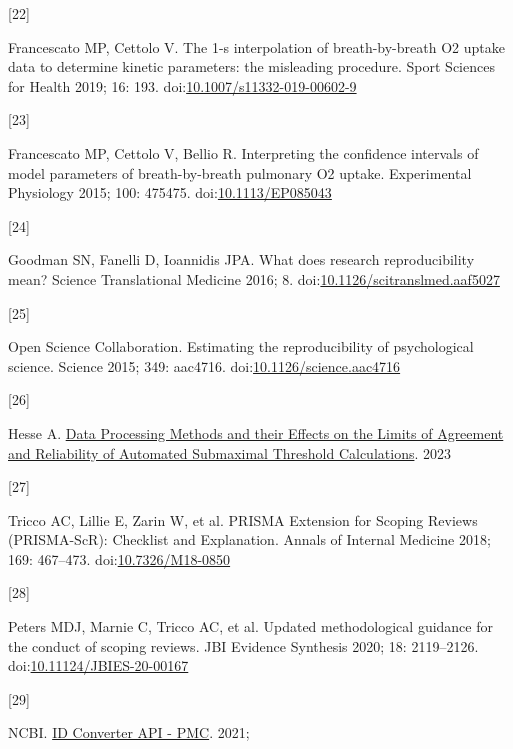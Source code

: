 \documentclass[
  letterpaper,
  DIV=11,
  numbers=noendperiod]{scrartcl}
\newlength{\cslhangindent}
\newlength{\csllabelwidth}
\newenvironment{CSLReferences}[2] %
 {\begin{list}{}{%
  \setlength{\itemindent}{0pt}
  \setlength{\leftmargin}{0pt}
  \setlength{\parsep}{0pt}
  \ifodd #1
   \setlength{\leftmargin}{\cslhangindent}
   \setlength{\itemindent}{-1\cslhangindent}
  \fi
  \setlength{\itemsep}{#2\baselineskip}}}
 {\end{list}}
\newcommand{\CSLLeftMargin}[1]{\parbox[t]{\csllabelwidth}{\strut#1\strut}}
\newcommand{\CSLRightInline}[1]{\parbox[t]{\linewidth - \csllabelwidth}{\strut#1\strut}}
\begin{document}
\begin{CSLReferences}{0}{1}
\CSLLeftMargin{{[}22{]} }%
\CSLRightInline{Francescato MP, Cettolo V. The 1-s interpolation of
breath-by-breath O2 uptake data to determine kinetic parameters: the
misleading procedure. Sport Sciences for Health 2019; 16: 193.
doi:\href{https://doi.org/10.1007/s11332-019-00602-9}{10.1007/s11332-019-00602-9}}

\CSLLeftMargin{{[}23{]} }%
\CSLRightInline{Francescato MP, Cettolo V, Bellio R. Interpreting the
confidence intervals of model parameters of breath-by-breath pulmonary
O2 uptake. Experimental Physiology 2015; 100: 475475.
doi:\href{https://doi.org/10.1113/EP085043}{10.1113/EP085043}}

\CSLLeftMargin{{[}24{]} }%
\CSLRightInline{Goodman SN, Fanelli D, Ioannidis JPA. What does research
reproducibility mean? Science Translational Medicine 2016; 8.
doi:\href{https://doi.org/10.1126/scitranslmed.aaf5027}{10.1126/scitranslmed.aaf5027}}

\CSLLeftMargin{{[}25{]} }%
\CSLRightInline{Open Science Collaboration. Estimating the
reproducibility of psychological science. Science 2015; 349: aac4716.
doi:\href{https://doi.org/10.1126/science.aac4716}{10.1126/science.aac4716}}

\CSLLeftMargin{{[}26{]} }%
\CSLRightInline{Hesse A.
\href{https://www.proquest.com/docview/2878185742/fulltextPDF/E53F9A0D3A0E45ADPQ/1?accountid=14586&sourcetype=Dissertations\%20&\%20Theses}{Data
Processing Methods and their Effects on the Limits of Agreement and
Reliability of Automated Submaximal Threshold Calculations}. 2023}

\CSLLeftMargin{{[}27{]} }%
\CSLRightInline{Tricco AC, Lillie E, Zarin W, et al. PRISMA Extension
for Scoping Reviews (PRISMA-ScR): Checklist and Explanation. Annals of
Internal Medicine 2018; 169: 467--473.
doi:\href{https://doi.org/10.7326/M18-0850}{10.7326/M18-0850}}

\CSLLeftMargin{{[}28{]} }%
\CSLRightInline{Peters MDJ, Marnie C, Tricco AC, et al. Updated
methodological guidance for the conduct of scoping reviews. JBI Evidence
Synthesis 2020; 18: 2119--2126.
doi:\href{https://doi.org/10.11124/JBIES-20-00167}{10.11124/JBIES-20-00167}}

\CSLLeftMargin{{[}29{]} }%
\CSLRightInline{NCBI.
\href{https://www.ncbi.nlm.nih.gov/pmc/tools/id-converter-api/}{ID
Converter API - PMC}. 2021;}


\end{CSLReferences}
\end{document}
